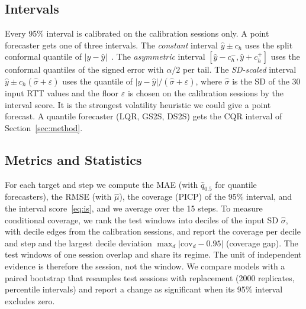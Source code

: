 \subsection{Intervals}
Every 95\% interval is calibrated on the calibration sessions only. A point forecaster gets one of three intervals. The \emph{constant} interval $\hat{y}\pm c_h$ uses the split conformal quantile of $|y-\hat{y}|$~\cite{lei2018distribution}. The \emph{asymmetric} interval $[\hat{y}-c^{-}_h,\hat{y}+c^{+}_h]$ uses the conformal quantiles of the signed error with $\alpha/2$ per tail. The \emph{SD-scaled} interval $\hat{y}\pm c_h(\hat{\sigma}+\varepsilon)$ uses the quantile of $|y-\hat{y}|/(\hat{\sigma}+\varepsilon)$, where $\hat{\sigma}$ is the SD of the 30 input RTT values and the floor $\varepsilon$ is chosen on the calibration sessions by the interval score. It is the strongest volatility heuristic we could give a point forecast. A quantile forecaster (LQR, GS2S, DS2S) gets the CQR interval of Section~\ref{sec:method}.

\subsection{Metrics and Statistics}
For each target and step we compute the MAE (with $\hat{q}_{0.5}$ for quantile forecasters), the RMSE (with $\hat{\mu}$), the coverage (PICP) of the 95\% interval, and the interval score~\eqref{eq:is}, and we average over the 15 steps. To measure conditional coverage, we rank the test windows into deciles of the input SD $\hat{\sigma}$, with decile edges from the calibration sessions, and report the coverage per decile and step and the largest decile deviation $\max_d|\mathrm{cov}_d-0.95|$ (coverage gap). The test windows of one session overlap and share its regime. The unit of independent evidence is therefore the session, not the window. We compare models with a paired bootstrap that resamples test sessions with replacement (2000 replicates, percentile intervals) and report a change as significant when its 95\% interval excludes zero.
